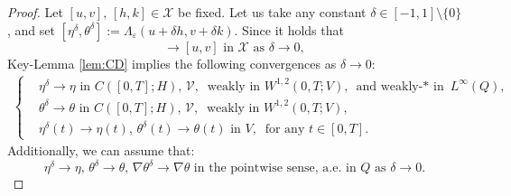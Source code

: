 \documentclass{sinst}
\numberwithin{equation}{section}
\theoremstyle{plain}
\theoremstyle{definition}
\def\sV{\mathscr{V}}
\def\sX{\mathscr{X}}
\begin{document}
\begin{proof}
  Let $[u,v], \,[h,k] \in \sX$ be fixed. Let us take any constant $\delta \in [-1,1] \setminus \{ 0 \}$, and set $[\eta^\delta, \theta^\delta] := \Lambda_\varepsilon(u + \delta h, v + \delta k)$. Since it holds that 
  \begin{equation}
    [u + \delta h, v + \delta k] \to [u,v] \mbox{ in } \sX \mbox{ as } \delta \to 0,
  \end{equation}
  Key-Lemma \ref{lem:CD} implies the following convergences as $\delta \to 0$:
  \begin{gather}
    \left\{ \begin{aligned}
      &\eta^\delta \to \eta \mbox{ in } C([0,T];H), \, \sV, \ \mbox{ weakly in } W^{1,2}(0,T;V), \mbox{ and weakly-$*$ in } L^\infty(Q),
      \\
      &\theta^\delta \to \theta \mbox{ in } C([0,T];H), \, \sV, \ \mbox{ weakly in } W^{1,2}(0,T;V),
      \\
      &\eta^\delta(t) \to \eta(t), \, \theta^\delta(t) \to \theta(t) \mbox{ in } V, \ \mbox{ for any } t \in [0,T].
    \end{aligned} \right. \label{Gateaux00}
  \end{gather}
  Additionally, we can assume that:
  \begin{equation}
    \eta^\delta \to \eta, \, \theta^\delta \to \theta, \, \nabla \theta^\delta \to \nabla \theta \mbox{ in the pointwise sense, a.e. in } Q \mbox{ as } \delta \to 0. \label{Gateaux00-1}
  \end{equation}


\end{proof}
\end{document}
